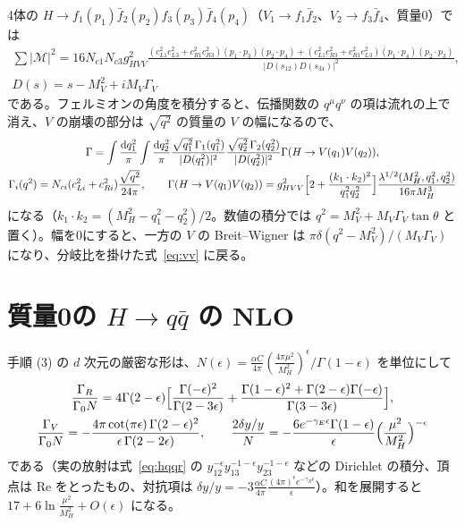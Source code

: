 \documentclass[a4paper,10pt]{ltjsarticle}
\newcommand{\dd}{\mathrm{d}}
\begin{document}
4体の $H\to f_1(p_1)\bar f_2(p_2)f_3(p_3)\bar f_4(p_4)$（$V_1\to f_1\bar f_2$、$V_2\to f_3\bar f_4$、質量0）では
\begin{equation}
\begin{gathered}
\sum|\mathcal M|^2=16N_{c1}N_{c3}g_{HVV}^2\frac{(c_{L1}^2c_{L3}^2+c_{R1}^2c_{R3}^2)(p_1\cdot p_3)(p_2\cdot p_4)+(c_{L1}^2c_{R3}^2+c_{R1}^2c_{L3}^2)(p_1\cdot p_4)(p_2\cdot p_3)}{|D(s_{12})D(s_{34})|^2},\\
D(s)=s-M_V^2+iM_V\Gamma_V
\end{gathered}
\label{eq:h4f}
\end{equation}
である。フェルミオンの角度を積分すると、伝播関数の $q^\mu q^\nu$ の項は流れの上で消え、$V$ の崩壊の部分は $\sqrt{q^2}$ の質量の $V$ の幅になるので、
\begin{equation}
\begin{gathered}
\Gamma=\int\frac{\dd q_1^2}\pi\int\frac{\dd q_2^2}\pi\frac{\sqrt{q_1^2}\,\Gamma_1(q_1^2)}{|D(q_1^2)|^2}\frac{\sqrt{q_2^2}\,\Gamma_2(q_2^2)}{|D(q_2^2)|^2}\Gamma(H\to V(q_1)V(q_2)),\\
\Gamma_i(q^2)=N_{ci}(c_{Li}^2+c_{Ri}^2)\frac{\sqrt{q^2}}{24\pi},\qquad
\Gamma(H\to V(q_1)V(q_2))=g_{HVV}^2\Bigl[2+\frac{(k_1\cdot k_2)^2}{q_1^2q_2^2}\Bigr]\frac{\lambda^{1/2}(M_H^2,q_1^2,q_2^2)}{16\pi M_H^3}
\end{gathered}
\label{eq:h4ffact}
\end{equation}
になる（$k_1\cdot k_2=(M_H^2-q_1^2-q_2^2)/2$。数値の積分では $q^2=M_V^2+M_V\Gamma_V\tan\theta$ と置く）。幅を0にすると、一方の $V$ の Breit--Wigner は $\pi\delta(q^2-M_V^2)/(M_V\Gamma_V)$ になり、分岐比を掛けた式~\eqref{eq:vv} に戻る。

\section{質量0の $H\to q\bar q$ の NLO}\label{app:hqq}

手順 (3) の $d$ 次元の厳密な形は、$N(\epsilon)=\frac{\alpha C}{4\pi}(\frac{4\pi\mu^2}{M_H^2})^\epsilon/\Gamma(1-\epsilon)$ を単位にして
\begin{equation}
\begin{gathered}
\frac{\Gamma_R}{\Gamma_0N}=4\Gamma(2-\epsilon)\Bigl[\frac{\Gamma(-\epsilon)^2}{\Gamma(2-3\epsilon)}+\frac{\Gamma(1-\epsilon)^2+\Gamma(2-\epsilon)\Gamma(-\epsilon)}{\Gamma(3-3\epsilon)}\Bigr],\\
\frac{\Gamma_V}{\Gamma_0N}=-\frac{4\pi\cot(\pi\epsilon)\,\Gamma(2-\epsilon)^2}{\epsilon\,\Gamma(2-2\epsilon)},\qquad
\frac{2\delta y/y}{N}=-\frac{6e^{-\gamma_E\epsilon}\Gamma(1-\epsilon)}{\epsilon}\Bigl(\frac{\mu^2}{M_H^2}\Bigr)^{-\epsilon}
\end{gathered}
\label{eq:hqqexact}
\end{equation}
である（実の放射は式~\eqref{eq:hqqr} の $y_{12}^{-\epsilon}y_{13}^{-1-\epsilon}y_{23}^{-1-\epsilon}$ などの Dirichlet の積分、頂点は $\mathrm{Re}$ をとったもの、対抗項は $\delta y/y=-3\frac{\alpha C}{4\pi}\frac{(4\pi)^\epsilon e^{-\gamma_E\epsilon}}\epsilon$）。和を展開すると $17+6\ln\frac{\mu^2}{M_H^2}+O(\epsilon)$ になる。
\end{document}
